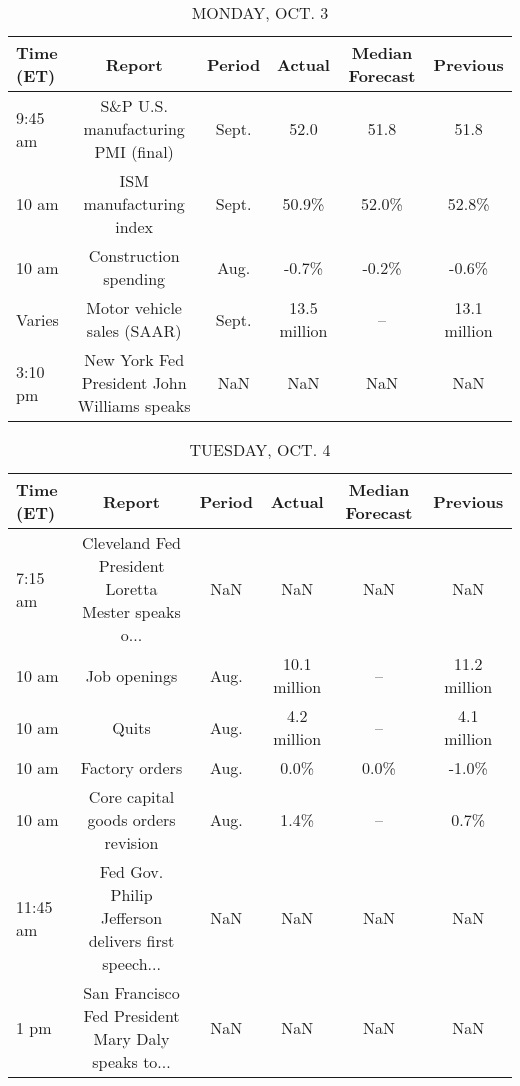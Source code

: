 \documentclass{article}%
\begin{document}
%
\normalsize%


\begin{table}[htbp]%
\caption{MONDAY, OCT. 3}%
\centering%
\begin{adjustbox}{width=1\textwidth}%
\begin{tabular}{lccccc}
\toprule
Time (ET) &                                      Report & Period &       Actual & Median Forecast &     Previous \\
\midrule
  9:45 am &          S\&P U.S. manufacturing PMI (final) &  Sept. &         52.0 &            51.8 &         51.8 \\
    10 am &                     ISM manufacturing index &  Sept. &        50.9\% &           52.0\% &        52.8\% \\
    10 am &                       Construction spending &   Aug. &        -0.7\% &           -0.2\% &        -0.6\% \\
   Varies &                  Motor vehicle sales (SAAR) &  Sept. & 13.5 million &              -- & 13.1 million \\
  3:10 pm & New York Fed President John Williams speaks &    NaN &          NaN &             NaN &          NaN \\
\bottomrule
\end{tabular}
%
\end{adjustbox}%
\end{table}

%


\begin{table}[htbp]%
\caption{TUESDAY, OCT. 4}%
\centering%
\begin{adjustbox}{width=1\textwidth}%
\begin{tabular}{lccccc}
\toprule
Time (ET) &                                             Report & Period &       Actual & Median Forecast &     Previous \\
\midrule
  7:15 am & Cleveland Fed President Loretta Mester speaks o... &    NaN &          NaN &             NaN &          NaN \\
    10 am &                                       Job openings &   Aug. & 10.1 million &              -- & 11.2 million \\
    10 am &                                              Quits &   Aug. &  4.2 million &              -- &  4.1 million \\
    10 am &                                     Factory orders &   Aug. &         0.0\% &            0.0\% &        -1.0\% \\
    10 am &                 Core capital goods orders revision &   Aug. &         1.4\% &              -- &         0.7\% \\
 11:45 am & Fed Gov. Philip Jefferson delivers first speech... &    NaN &          NaN &             NaN &          NaN \\
     1 pm & San Francisco Fed President Mary Daly speaks to... &    NaN &          NaN &             NaN &          NaN \\
\bottomrule
\end{tabular}
%
\end{adjustbox}%
\end{table}
\end{document}
